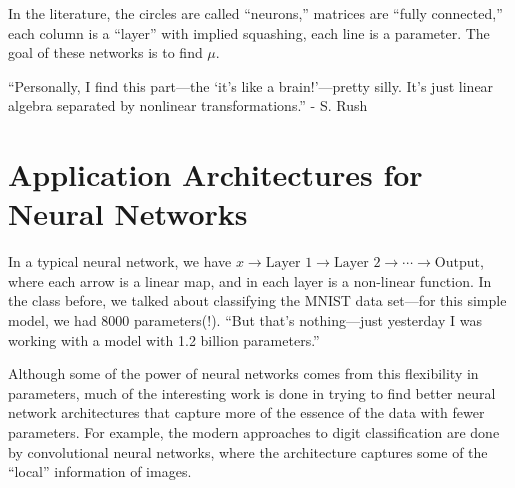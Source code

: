 \documentclass{article}
\begin{document}
In the literature, the circles are called ``neurons,'' matrices are ``fully connected,'' each column is a ``layer'' with implied squashing, each line is a parameter. The goal of these networks is to find $\mu$.

``Personally, I find this part---the `it's like a brain!'---pretty silly. It's just linear algebra separated by nonlinear transformations.'' - S. Rush

\section{Application Architectures for Neural Networks}

In a typical neural network, we have $x\to\text{Layer 1}\to\text{Layer 2}\to\cdots\to\text{Output}$, where each arrow is a linear map, and in each layer is a non-linear function. In the class before, we talked about classifying the MNIST data set---for this simple model, we had 8000 parameters(!). ``But that's nothing---just yesterday I was working with a model with 1.2 billion parameters.''

Although some of the power of neural networks comes from this flexibility in parameters, much of the interesting work is done in trying to find better neural network architectures that capture more of the essence of the data with fewer parameters. For example, the modern approaches to digit classification are done by convolutional neural networks, where the architecture captures some of the ``local'' information of images.
\end{document}
